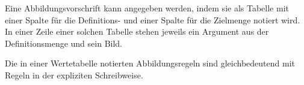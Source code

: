 \documentclass[]{uebungsblatt}
\begin{document}
\newpage
\begin{remark}
        
    Eine Abbildungsvorschrift kann angegeben werden, indem sie als Tabelle mit einer Spalte für die Definitions- und einer Spalte für die Zielmenge notiert wird. In einer Zeile einer solchen Tabelle stehen jeweils ein Argument aus der Definitionsmenge und sein Bild.
    
    Die in einer Wertetabelle notierten Abbildungsregeln sind gleichbedeutend mit Regeln in der expliziten Schreibweise.
\end{remark}
\end{document}
